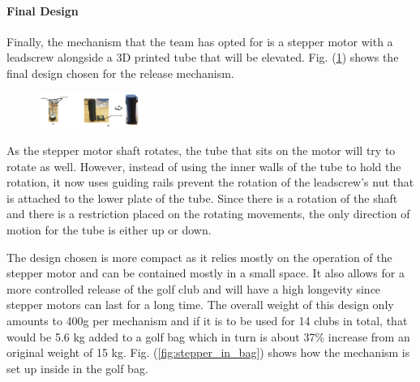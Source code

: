 \documentclass[11pt,landscape]{article}
\begin{document}
\begin{multicols}{3}
\paragraph{Final Design}
Finally, the mechanism that the team has opted for is a stepper motor with a
leadscrew alongside a 3D printed tube that will be elevated. Fig.
(\ref{fig:final_stepper}) shows the final design chosen for the release
mechanism.
\begin{figure}[H]
    \begin{center}
        \includegraphics[width=0.3\textwidth]{Final Stepper motor design.PNG}
        \label{fig:final_stepper}
    \end{center}
\end{figure}

As the stepper motor shaft rotates, the tube that sits on the motor will try to
rotate as well. However, instead of using the inner walls of the tube to hold
the rotation, it now uses guiding rails prevent the rotation of the leadscrew’s
nut that is attached to the lower plate of the tube. Since there is a rotation
of the shaft and there is a restriction placed on the rotating movements, the
only direction of motion for the tube is either up or down.

The design chosen is more compact as it relies mostly on the operation of the
stepper motor and can be contained mostly in a small space. It also allows for a
more controlled release of the golf club and will have a high longevity since
stepper motors can last for a long time. The overall weight of this design only
amounts to 400g per mechanism and if it is to be used for 14 clubs in total,
that would be 5.6 kg added to a golf bag which in turn is about 37\% increase
from an original weight of 15 kg. Fig. (\ref{fig:stepper_in_bag}) shows how the mechanism
is set up inside in the golf bag.


\end{multicols}
\end{document}
